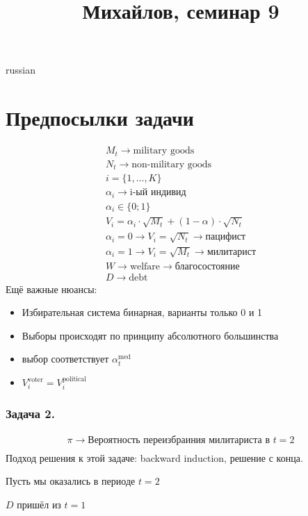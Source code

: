 \documentclass{article}
\begin{document}
\title{\foreignlanguage{russian}{Михайлов, семинар 9}}
\maketitle
\begin{otherlanguage*}{russian}
\section*{Предпосылки задачи}
\begin{align*}
M_t \rightarrow \text{military goods} \\ 
N_t \rightarrow \text{non-military goods} \\ 
i = \{1, \ldots, K \} \\
\alpha_i \rightarrow \text{i-ый индивид} \\
\alpha_i \in \{ 0; 1\} \\
V_i = \alpha_i \cdot \sqrt{M_t} + (1 - \alpha) \cdot \sqrt{N_t} \\
\alpha_i = 0 \rightarrow V_i = \sqrt{N_t} \rightarrow \text{пацифист} \\ 
\alpha_i = 1 \rightarrow V_i = \sqrt{M_t} \rightarrow \text{милитарист} \\ 
W \rightarrow \text{welfare} \rightarrow \text{благосостояние} \\
D \rightarrow \text{debt} 
\end{align*}
Ещё важные нюансы: 
\begin{itemize}
\item Избирательная система бинарная, варианты только 0 и 1 
\item Выборы происходят по принципу абсолютного большинства 
\item выбор соответствует $ \alpha_t^{\text{med}}$
\item $ V_i^{\text{voter}} = V_i^{\text{political}} $
\end{itemize}
\subsubsection*{Задача 2. }
\begin{align*}
\mathcal{\pi} \rightarrow \text{Вероятность  переизбраиния милитариста в } t = 2 \\ 
\end{align*}
Подход решения к этой задаче: backward induction, решение с конца. 

Пусть мы оказались в периоде $t = 2$

$D$ пришёл из $t = 1$


\end{otherlanguage*}
\end{document}
